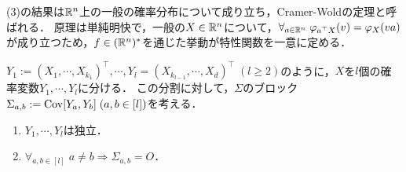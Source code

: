 \documentclass[uplatex,dvipdfmx]{jsreport}
\begin{document}
\begin{remarks}
    (3)の結果は$\mathbb{R}^n$上の一般の確率分布について成り立ち，Cramer-Woldの定理と呼ばれる．
    原理は単純明快で，一般の$X\in\mathbb{R}^n$について，$\forall_{a\in\mathbb{R}^n}\;\varphi_{a^\top X}(v)=\varphi_X(va)$が成り立つため，$f\in(\mathbb{R}^n)^*$を通じた挙動が特性関数を一意に定める．
\end{remarks}

\begin{lemma}[多次元正規確率変数の成分間の独立性の特徴付け]
    $Y_1:=(X_1,\cdots,X_{k_1})^\top,\cdots,Y_l=(X_{k_{l-1}},\cdots,X_d)^\top\;(l\ge 2)$のように，$X$を$l$個の確率変数$Y_1,\cdots,Y_l$に分ける．
    この分割に対して，$\Sigma$のブロック$\Sigma_{a,b}:=\mathrm{Cov}[Y_a,Y_b]\;(a,b\in[l])$を考える．
    \begin{enumerate}
        \item $Y_1,\cdots,Y_l$は独立．
        \item $\forall_{a,b\in[l]}\;a\ne b\Rightarrow\Sigma_{a,b}=O$．
    \end{enumerate}
\end{lemma}
\end{document}

